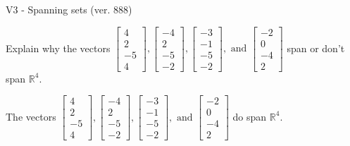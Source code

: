 \begin{exercise}
  \begin{exerciseTitle}V3 - Spanning sets (ver. 888)\end{exerciseTitle}
  \begin{exerciseStatement}
    Explain why the vectors \(\left[\begin{array}{r}
4 \\
2 \\
-5 \\
4
\end{array}\right] , \left[\begin{array}{r}
-4 \\
2 \\
-5 \\
-2
\end{array}\right] , \left[\begin{array}{r}
-3 \\
-1 \\
-5 \\
-2
\end{array}\right] , \text{ and } \left[\begin{array}{r}
-2 \\
0 \\
-4 \\
2
\end{array}\right]\) span or don't span \(\mathbb{R}^4\). 
	


  \end{exerciseStatement}
  \begin{exerciseAnswer}
   The vectors \(\left[\begin{array}{r}
4 \\
2 \\
-5 \\
4
\end{array}\right] , \left[\begin{array}{r}
-4 \\
2 \\
-5 \\
-2
\end{array}\right] , \left[\begin{array}{r}
-3 \\
-1 \\
-5 \\
-2
\end{array}\right] , \text{ and } \left[\begin{array}{r}
-2 \\
0 \\
-4 \\
2
\end{array}\right]\) 
  	 do  
	span \(\mathbb{R}^4\).
  


  \end{exerciseAnswer}
\end{exercise}